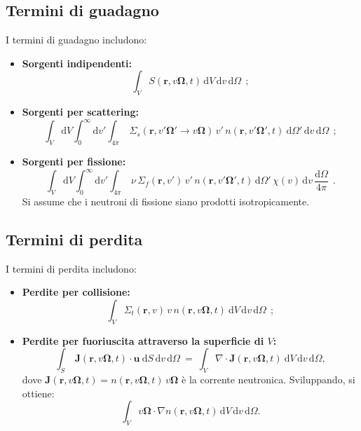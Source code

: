 \subsection{Termini di guadagno}
I termini di guadagno includono:
\begin{itemize}[nosep, leftmargin=*]
	\item \textbf{Sorgenti indipendenti:}
	\begin{equation}
		\int_{V} S(\mathbf{r}, v\boldsymbol{\Omega}, t) \, \mathrm{d}V \, \mathrm{d}v \, \mathrm{d}\Omega\ \ ;
	\end{equation}
	\item \textbf{Sorgenti per scattering:}
	\begin{equation}
		\int_{V} \mathrm{d}V \int_{0}^{\infty} \mathrm{d}v' \int_{4\pi}\ \Sigma_s(\mathbf{r}, v'\boldsymbol{\Omega}' \rightarrow v\boldsymbol{\Omega})\, v'\, n(\mathbf{r}, v'\boldsymbol{\Omega}', t)\ \mathrm{d}\Omega' \, \mathrm{d}v \, \mathrm{d}\Omega\ \ ;
	\end{equation}
	\item \textbf{Sorgenti per fissione:}
	\begin{equation}
		\int_{V} \mathrm{d}V \int_{0}^{\infty} \mathrm{d}v' \int_{4\pi}\ \nu\, \Sigma_f(\mathbf{r}, v')\, v'\, n(\mathbf{r}, v'\boldsymbol{\Omega}', t) \, \mathrm{d}\Omega' \, \chi(v) \, \mathrm{d}v \, \frac{\mathrm{d}\Omega}{4\pi}\ \ .
	\end{equation}
	Si assume che i neutroni di fissione siano prodotti isotropicamente.
\end{itemize}

%
%
\subsection{Termini di perdita}
I termini di perdita includono:
\begin{itemize}[nosep, leftmargin=*]
	\item \textbf{Perdite per collisione:}
	\begin{equation}
		\int_{V} \Sigma_t(\mathbf{r}, v)\, v\, n(\mathbf{r}, v \boldsymbol{\Omega}, t) \ \mathrm{d}V \, \mathrm{d}v \, \mathrm{d}\Omega\ \ ;
	\end{equation}
	\item \textbf{Perdite per fuoriuscita attraverso la superficie di $V$:}
	\begin{equation}
		\int_{S}\ \mathbf{J}(\mathbf{r}, v\boldsymbol{\Omega}, t) \cdot \mathbf{u} \ \mathrm{d}S \, \mathrm{d}v \, \mathrm{d}\Omega\ =\ \int_{V} \nabla \cdot \mathbf{J}(\mathbf{r}, v\boldsymbol{\Omega}, t) \ \mathrm{d}V \, \mathrm{d}v \, \mathrm{d}\Omega,
	\end{equation}
	dove $\mathbf{J}(\mathbf{r}, v\boldsymbol{\Omega}, t) = n(\mathbf{r}, v\boldsymbol{\Omega}, t)\, v\boldsymbol{\Omega}$ è la corrente neutronica. Sviluppando, si ottiene:
	\begin{equation}
		\int_{V} v\boldsymbol{\Omega} \cdot \nabla n(\mathbf{r}, v\boldsymbol{\Omega}, t) \, \mathrm{d}V \, \mathrm{d}v \, \mathrm{d}\Omega.
	\end{equation}
\end{itemize}


